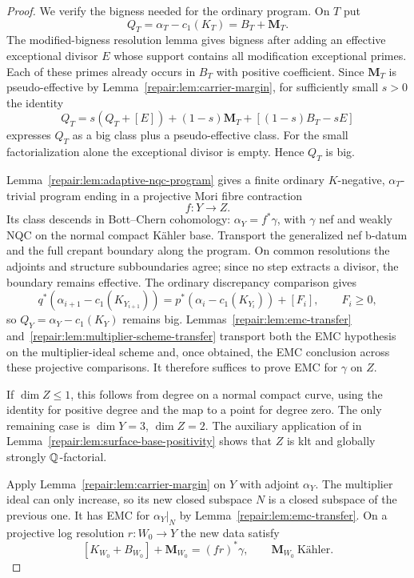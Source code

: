 \begin{proof}
We verify the bigness needed for the ordinary program. On $T$ put
\[
                    Q_T=\alpha_T-c_1(K_T)=B_T+\mathbf M_T.
\]
The modified-bigness resolution lemma
\cite[Lemma~2.10]{HX2026} gives bigness after adding an effective
exceptional divisor $E$ whose support contains all modification
exceptional primes. Each of these primes already occurs in $B_T$
with positive coefficient. Since $\mathbf M_T$ is pseudo-effective
by Lemma~\ref{repair:lem:carrier-margin}, for sufficiently small
$s>0$ the identity
\[
 Q_T=s(Q_T+[E])+(1-s)\mathbf M_T+
                         [(1-s)B_T-sE]
\]
expresses $Q_T$ as a big class plus a pseudo-effective class.
For the small factorialization alone the exceptional divisor is
empty. Hence $Q_T$ is big.

Lemma~\ref{repair:lem:adaptive-nqc-program} gives a finite ordinary
$K$-negative, $\alpha_T$-trivial program ending in a projective Mori
fibre contraction
\[
                              f:Y\to Z.
\]
Its class descends in Bott--Chern cohomology:
$\alpha_Y=f^*\gamma$, with $\gamma$ nef and weakly NQC on the
normal compact K\"ahler base. Transport the generalized nef
b-datum and the full crepant boundary along the program. On common
resolutions the adjoints and structure subboundaries agree; since
no step extracts a divisor, the boundary remains effective.
The ordinary discrepancy comparison gives
\[
 q^*(\alpha_{i+1}-c_1(K_{Y_{i+1}}))
       =p^*(\alpha_i-c_1(K_{Y_i}))+[F_i],\qquad F_i\geq0,
\]
so $Q_Y=\alpha_Y-c_1(K_Y)$ remains big.
Lemmas~\ref{repair:lem:emc-transfer}
and~\ref{repair:lem:multiplier-scheme-transfer} transport both the
EMC hypothesis on the multiplier-ideal scheme and, once obtained,
the EMC conclusion across these projective comparisons.
It therefore suffices to prove EMC for $\gamma$ on $Z$.

If $\dim Z\leq1$, this follows from degree on a normal compact
curve, using the identity for positive degree and the map to a
point for degree zero. The only remaining case is
$\dim Y=3$, $\dim Z=2$. The auxiliary application of
\cite[Theorem~2.3]{HP2024} in
Lemma~\ref{repair:lem:surface-base-positivity} shows that $Z$ is
klt and globally strongly $\mathbb Q$-factorial.

Apply Lemma~\ref{repair:lem:carrier-margin} on $Y$ with adjoint
$\alpha_Y$. The multiplier ideal can only increase, so its new
closed subspace $N$ is a closed subspace of the previous one.
It has EMC for $\alpha_Y|_N$ by
Lemma~\ref{repair:lem:emc-transfer}. On a projective log resolution
$r:W_0\to Y$ the new data satisfy
\[
 [K_{W_0}+B_{W_0}]+\mathbf M_{W_0}=(fr)^*\gamma,
 \qquad \mathbf M_{W_0}\ \text{K\"ahler}.
\]


\end{proof}
